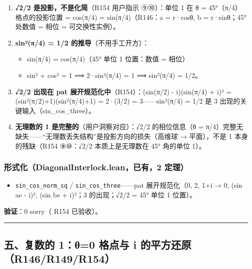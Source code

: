 \documentclass[
]{article}
\providecommand{\tightlist}{%
 \setlength{\itemsep}{0pt}\setlength{\parskip}{0pt}}
\begin{document}
\begin{enumerate}
\def\labelenumi{\arabic{enumi}.}
\tightlist
\item
 \textbf{√2/2 是投影，不是化简}（R154 用户指示 ⑨⑩）：单位 1 在 θ =
 45°（π/4）格点的投影位置 = cos(π/4) = sin(π/4)（R146：a = r·cosθ, b =
 r·sinθ；45° 处数值 = 相位 = 可交换性实例）。
\item
 \textbf{sin²(π/4) = 1/2 的推导}（不用手工开方）：

 \begin{itemize}
 \tightlist
 \item
 sin(π/4) = cos(π/4)（45° 单位 1 位置：数值 = 相位）
 \item
 sin² + cos² = 1 ⟹ 2·sin²(π/4) = 1 ⟹ sin²(π/4) = 1/2。
 \end{itemize}
\item
 \textbf{√2/2 出现在 pat 展开规范化中}（R154）：\textbar(sin(π/2) -
 i)(sin(π/4) + i)\textbar² = (sin²(π/2)+1)(sin²(π/4)+1) = 2·(3/2) =
 3------sin²(π/4) = 1/2 是 3 出现的关键输入（sin\_cos\_three）。
\item
 \textbf{无理数的 1 是完整的}（用户洞察对应）：√2/2 的相位信息（θ =
 π/4）完整无缺失------``无理数丢失结构''是投影方向的损失（高维球 →
 平面），不是 1 本身的残缺（R154 ⑨⑩：√2/2 本质上是无理数在 45° 角的单位
 1）。
\end{enumerate}

\subsubsection{形式化（DiagonalInterlock.lean，已有，2
定理）}\label{ux5f62ux5f0fux5316diagonalinterlock.leanux5df2ux67092-ux5b9aux7406}

\begin{itemize}
\tightlist
\item
 \texttt{sin\_cos\_norm\_sq} / \texttt{sin\_cos\_three}------pat
 展开规范化（0, 2, 1+i → 0, (sin ae - i)², (sin be + i)²；3
 的出现；√2/2 = 45° 单位 1 位置）。
\end{itemize}

\textbf{验证}：0 sorry（ R154 已验收）。

\begin{center}\rule{0.5\linewidth}{0.5pt}\end{center}

\subsection{五、复数的 1：θ=0 格点与 i
的平方还原（R146/R149/R154）}\label{ux4e94ux590dux6570ux7684-1ux3b80-ux683cux70b9ux4e0e-i-ux7684ux5e73ux65b9ux8fd8ux539fr146r149r154}
\end{document}
